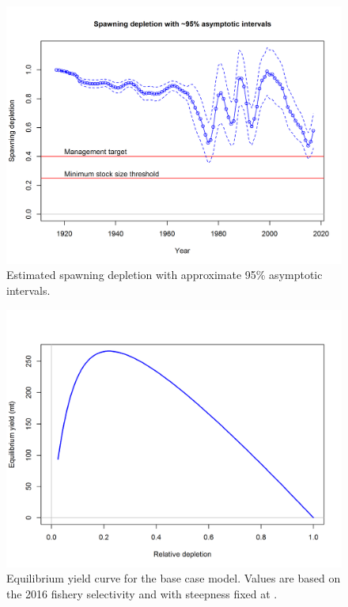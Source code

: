 \documentclass[12pt,]{article}
\begin{document}
\begin{figure}[htbp]
\centering
\includegraphics{r4ss/plots_mod1/ts9_Spawning_depletion_with_95_asymptotic_intervals_intervals.png}
\caption{Estimated spawning depletion with approximate 95\% asymptotic
intervals.
\label{fig:ts9_Spawning_depletion_with_95_asymptotic_intervals_intervals}}
\end{figure}

\begin{figure}[htbp]
\centering
\includegraphics{r4ss/plots_mod1/yield1_yield_curve.png}
\caption{Equilibrium yield curve for the base case model. Values are
based on the 2016 fishery selectivity and with steepness fixed at .
\label{fig:yield1_yield_curve}}
\end{figure}
\end{document}
